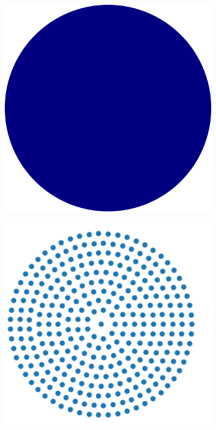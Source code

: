\documentclass[preprint,12pt]{elsarticle}
\begin{document}
\begin{figure}[!htpb]
  \centering
  \begin{subfigure}{0.22\textwidth}
    \centering
    \includegraphics[width=1.0\textwidth]{images/rfc_explantion_schematic/real_spherical_particles}
  \end{subfigure}\hspace{15mm}%
  \begin{subfigure}{0.24\textwidth}
    \centering
    \includegraphics[width=1.0\textwidth]{images/rfc_explantion_schematic/sph_sampled_spherical_particles}
  \end{subfigure}
  \caption{}
\label{fig:real_particle_sph_sampling}
\end{figure}
\end{document}
